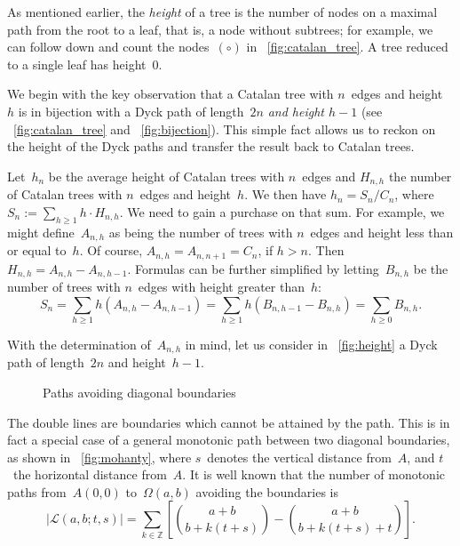 As mentioned earlier, the \emph{height} of a tree is the number of
nodes on a maximal path from the root to a leaf, that is, a node
without subtrees; for example, we can follow down and count the
nodes~\((\circ)\) in \fig~\ref{fig:catalan_tree}. A tree reduced to a
single leaf has height~\(0\).

We begin with the key observation that a Catalan tree with \(n\)~edges
and height~\(h\) is in bijection with a Dyck path of length~\(2n\)
\emph{and height \(h-1\)} (see \fig~\vref{fig:catalan_tree} and
\fig~\ref{fig:bijection}). This simple fact allows us to reckon on the
height of the Dyck paths and transfer the result back to Catalan
trees.

Let~\(h_n\) be the average height of Catalan trees with \(n\)~edges
and \(H_{n,h}\) the number of Catalan trees with \(n\)~edges and
height~\(h\). We then have \(h_n = S_n/C_{n}\), where \(S_n := \sum_{h
  \geqslant 1} h \cdot H_{n,h}\). We need to gain a purchase on that
sum. For example, we might define~\(A_{n,h}\) as being the number of
trees with \(n\)~edges and height less than or equal to~\(h\). Of
course, \(A_{n,h} = A_{n,n+1} = C_{n}\), if \(h > n\). Then \(H_{n,h}
= A_{n,h}-A_{n,h-1}\). Formulas can be further simplified by
letting~\(B_{n,h}\) be the number of trees with \(n\)~edges with
height greater than~\(h\):
\begin{equation}
S_n = \sum_{h \geqslant 1}h(A_{n,h}-A_{n,h-1})
    = \sum_{h \geqslant 1}h(B_{n,h-1}-B_{n,h}) = \sum_{h\geqslant 0} B_{n,h}.
\label{eq:Sn}
\end{equation} 

With the determination of~\(A_{n,h}\) in mind, let us consider in
\fig~\ref{fig:height} a Dyck path of length~\(2n\) and height~\(h-1\).
\begin{figure}[t]
\centering
{}
\quad
{}
\caption{Paths avoiding diagonal boundaries\label{fig:boundaries}}
\end{figure}
The double lines are boundaries which cannot be attained by the
path. This is in fact a special case of a general monotonic path
between two diagonal boundaries, as shown in \fig~\ref{fig:mohanty},
where \(s\)~denotes the vertical distance from~\(A\), and \(t\)~the
horizontal distance from~\(A\). It is well known that the number of
monotonic paths from~\(A(0,0)\) to~\(\Omega(a,b)\) avoiding the
boundaries is
\begin{equation}
\left\lvert\mathcal{L}(a,b;t,s)\right\rvert = \sum_{k \in \mathbb{Z}}\left[\binom{a+b}{b+k(t+s)} - \binom{a+b}{b+k(t+s)+t}\right].
\label{eq:mohanty}
\end{equation}

